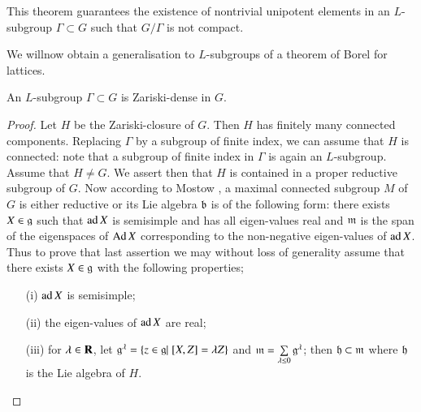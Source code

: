 This theorem guarantees the existence of nontrivial unipotent elements in an $L$-subgroup $\Gamma \subset G$ such that $G/\Gamma$ is not compact.

We will\pageoriginale  now obtain a generalisation to $L$-subgroups of a theorem of Borel for lattices.

\begin{theorem}\label{art9-thm1.8}
An $L$-subgroup $\Gamma \subset G$ is Zariski-dense in $G$.
\end{theorem}

\begin{proof}
Let $H$ be the Zariski-closure of $G$. Then $H$ has finitely many connected components. Replacing $\Gamma$ by a subgroup of finite index, we can assume that $H$ is connected: note that a subgroup of finite index in $\Gamma$ is again an $L$-subgroup. Assume that $H \neq G$. We assert then that $H$ is contained in a proper reductive subgroup of $G$. Now according to Mostow \cite{art9-key1}, a maximal connected subgroup $M$ of $G$ is either reductive or its Lie algebra $\mathfrak{b}$ is of the following form: there exists $X \in \mathfrak{g}$ such that $\operatorname{ad} X$ is semisimple and has all eigen-values real and $\mathfrak{m}$ is the span of the eigenspaces of $\operatorname{Ad} X$ corresponding to the non-negative eigen-values of $\operatorname{ad} X$. Thus to prove that last assertion we may without loss of generality assume that there exists $X \in \mathfrak{g}$ with the following properties;
\begin{itemize}
\item[(i)] $\operatorname{ad} X$ is semisimple;

\item[(ii)] the eigen-values of $\operatorname{ad} X$ are real;

\item[(iii)] for $\lambda \in \mathbf{R}$, let $\mathfrak{g}^\lambda = \{z \in \mathfrak{g} | \; [X, Z] = \lambda Z\}$ and $\mathfrak{m} = \sum\limits_{\lambda \leq 0} \mathfrak{g}^\lambda$; then $\mathfrak{h} \subset \mathfrak{m}$ where $\mathfrak{h}$ is the Lie algebra of $H$.
\end{itemize}


\end{proof}
